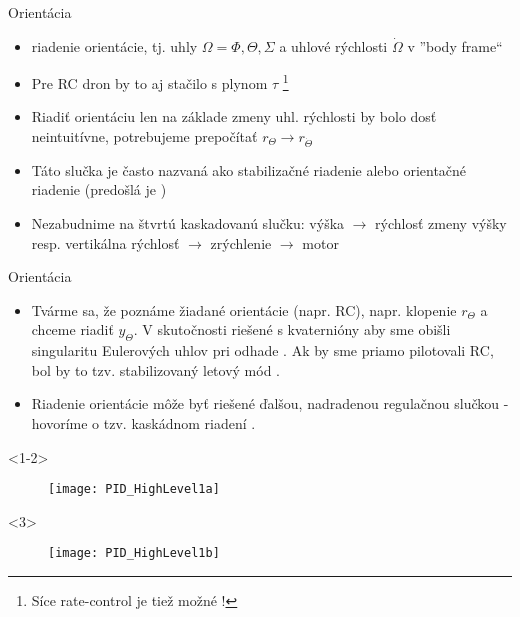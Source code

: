 \begin{frame}[t]{Orientácia}
\begin{itemize}
  \item<1-> riadenie orientácie, tj. uhly $\Omega={\Phi, \Theta, \Sigma}$ a uhlové rýchlosti $\dot\Omega$ v ''body frame``
  \item<2-> Pre RC dron by to aj stačilo s plynom $\tau$ \footnote{Síce rate-control je tiež možné \citep{Boland2015}!} \citep{Boland2015}
  \item<3-> Riadiť orientáciu  len na základe zmeny uhl. rýchlosti  by bolo dosť neintuitívne, potrebujeme prepočítať $r_{\Theta} \rightarrow r_{\dot{\Theta}}$
      \item<4-> Táto slučka je často nazvaná ako stabilizačné riadenie  alebo orientačné riadenie  (predošlá je )
      \item<5-> Nezabudnime na štvrtú kaskadovanú slučku: výška $\rightarrow$ rýchlosť zmeny výšky resp. vertikálna rýchlosť  $\rightarrow$ zrýchlenie $\rightarrow$ motor
\end{itemize}
\end{frame}


\begin{frame}[t]{Orientácia}
\begin{itemize}
  \item<1-> Tvárme sa, že poznáme žiadané orientácie (napr. RC), napr. klopenie $r_{\Theta}$ a chceme riadiť $y_{\Theta}$.  V skutočnosti riešené s kvaternióny aby sme obišli singularitu Eulerových uhlov pri odhade \citep{Erasmus2020}. Ak by sme priamo pilotovali RC, bol by to tzv. stabilizovaný letový mód \citep{Boland2015}.
  \item<2-> Riadenie orientácie môže byť riešené ďalšou, nadradenou regulačnou slučkou - hovoríme o tzv. kaskádnom riadení .
  \end{itemize}


    \begin{onlyenv}<1-2>
  \begin{figure}
\centering
  \texttt{[image: PID\_HighLevel1a]}\\
\end{figure}
\end{onlyenv}



    \begin{onlyenv}<3>
  \begin{figure}
\centering
  \texttt{[image: PID\_HighLevel1b]}\\
\end{figure}
\end{onlyenv}

  \end{frame}



